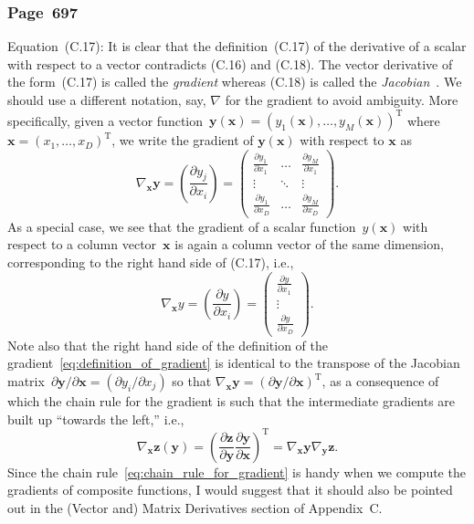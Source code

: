 \documentclass[12pt,a4paper]{article}
\newcommand{\erratum}[1]{\subsubsection*{#1}}
\begin{document}
\erratum{Page~697}
Equation~(C.17):
It is clear that the definition~(C.17) of the derivative of a scalar with respect to a vector
contradicts (C.16) and (C.18).
The vector derivative of the form~(C.17) is called the \emph{gradient}
whereas (C.18) is called the \emph{Jacobian}~\citep{Minka:OldNewMatrixAlgebra}.
We should use a different notation, say, $\nabla$ for the gradient to avoid ambiguity.
More specifically, given a vector function~$\mathbf{y}(\mathbf{x}) =
\left(y_1(\mathbf{x}), \dots, y_M(\mathbf{x})\right)^{\operatorname{T}}$
where $\mathbf{x} = \left(x_1, \dots, x_D \right)^{\operatorname{T}}$,
we write the gradient of $\mathbf{y}(\mathbf{x})$ with respect to $\mathbf{x}$ as
\begin{equation}
\nabla_{\mathbf{x}} \mathbf{y} = \left( \frac{\partial y_j}{\partial x_i} \right) =
\begin{pmatrix}
\frac{\partial y_1}{\partial x_1} & \hdots & \frac{\partial y_M}{\partial x_1} \\
\vdots & \ddots & \vdots \\
\frac{\partial y_1}{\partial x_D} & \hdots & \frac{\partial y_M}{\partial x_D}
\end{pmatrix} .
\label{eq:definition_of_gradient}
\end{equation}
As a special case, we see that the gradient of a scalar function~$y(\mathbf{x})$ with respect to
a column vector~$\mathbf{x}$ is again a column vector of the same dimension,
corresponding to the right hand side of (C.17), i.e.,
\begin{equation}
\nabla_{\mathbf{x}} y = \left( \frac{\partial y}{\partial x_i} \right) =
\begin{pmatrix}
\frac{\partial y}{\partial x_1} \\
\vdots  \\
\frac{\partial y}{\partial x_D}
\end{pmatrix} .
\end{equation}
Note also that the right hand side of the definition of
the gradient~\eqref{eq:definition_of_gradient} is identical to
the transpose of the Jacobian matrix~$\partial\mathbf{y}/\partial\mathbf{x} =
\left( \partial y_i/\partial x_j \right)$
so that $\nabla_{\mathbf{x}} \mathbf{y} =
\left( \partial\mathbf{y}/\partial\mathbf{x} \right)^{\operatorname{T}}$,
as a consequence of which the chain rule for the gradient is such that the intermediate gradients
are built up ``towards the left,'' i.e.,
\begin{equation}
\nabla_{\mathbf{x}} \mathbf{z}(\mathbf{y}) =
\left(
  \frac{\partial\mathbf{z}}{\partial\mathbf{y}}
  \frac{\partial\mathbf{y}}{\partial\mathbf{x}}
\right)^{\operatorname{T}} =
\nabla_\mathbf{x} \mathbf{y} \nabla_\mathbf{y} \mathbf{z}.
\label{eq:chain_rule_for_gradient}
\end{equation}
Since the chain rule~\eqref{eq:chain_rule_for_gradient} is handy
when we compute the gradients of composite functions,
I would suggest that it should also be pointed out in the (Vector and) Matrix Derivatives section
of Appendix~C.
\end{document}
